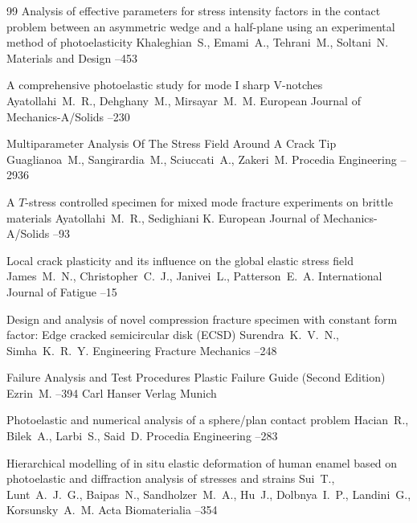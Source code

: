 \begin{thebibliography}{99}
\paper Analysis of effective parameters for stress intensity factors in the contact problem between an asymmetric wedge and a half-plane using an experimental method of photoelasticity
\by  Khaleghian~S., Emami~A., Tehrani~M., Soltani~N.
\jour Materials and Design
--453

\paper A comprehensive photoelastic study for mode I sharp V-notches
\by Ayatollahi~M.~R., Dehghany~M., Mirsayar~M.~M.
\jour European Journal of Mechanics-A/Solids
--230

\paper Multiparameter Analysis Of The Stress Field Around A Crack Tip
\by Guaglianoa~M., Sangirardia~M., Sciuccati~A., Zakeri~M.
\jour Procedia Engineering
--2936

\paper A $T$-stress controlled specimen for mixed mode fracture experiments on brittle materials
\by Ayatollahi~M.~R., Sedighiani K.
\jour European Journal of Mechanics-A/Solids
--93

\paper Local crack plasticity and its influence on the global elastic stress field
\by James~M.~N., Christopher~C.~J., Janivei~L., Patterson~E.~A.
\jour International Journal of Fatigue
--15

\paper Design and analysis of novel compression fracture specimen with constant form factor: Edge cracked semicircular disk (ECSD)
\by Surendra~K.~V.~N., Simha~K.~R.~Y.
\jour Engineering Fracture Mechanics
--248

\paper Failure Analysis and Test Procedures
\inbook Plastic Failure Guide \rm (Second Edition)
\by Ezrin~M.
--394
\publ Carl Hanser Verlag
\publaddr Munich 

\paper Photoelastic and numerical analysis of a sphere/plan contact problem
\by Hacian~R., Bilek~A., Larbi~S., Said~D.
\jour Procedia Engineering
--283

\paper Hierarchical modelling of in situ elastic deformation of human enamel based on photoelastic and diffraction analysis of stresses and strains
\by Sui~T., Lunt~A.~J.~G., Baipas~N., Sandholzer~M.~A., Hu~J., Dolbnya~I.~P., Landini~G., Korsunsky~A.~M.
\jour Acta Biomaterialia
--354



\end{thebibliography}
